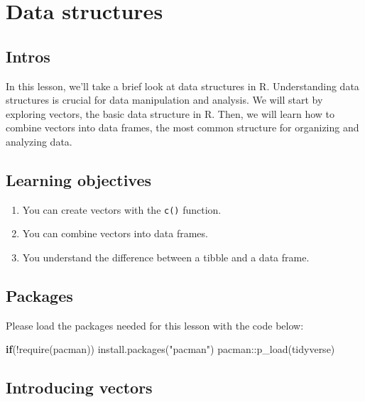 \documentclass[
  letterpaper,
  DIV=11,
  numbers=noendperiod]{scrreprt}
\newenvironment{Shaded}{\begin{snugshade}}{\end{snugshade}}
\newcommand{\ControlFlowTok}[1]{\textcolor[rgb]{0.00,0.23,0.31}{\textbf{#1}}}
\newcommand{\FunctionTok}[1]{\textcolor[rgb]{0.28,0.35,0.67}{#1}}
\newcommand{\NormalTok}[1]{\textcolor[rgb]{0.00,0.23,0.31}{#1}}
\newcommand{\SpecialCharTok}[1]{\textcolor[rgb]{0.37,0.37,0.37}{#1}}
\newcommand{\StringTok}[1]{\textcolor[rgb]{0.13,0.47,0.30}{#1}}
\begin{document}
\chapter{Data structures}\label{data-structures}

\section{Intros}\label{intros}

In this lesson, we'll take a brief look at data structures in R.
Understanding data structures is crucial for data manipulation and
analysis. We will start by exploring vectors, the basic data structure
in R. Then, we will learn how to combine vectors into data frames, the
most common structure for organizing and analyzing data.

\section{Learning objectives}\label{learning-objectives-5}

\begin{enumerate}
\def\labelenumi{\arabic{enumi}.}
\item
  You can create vectors with the \texttt{c()} function.
\item
  You can combine vectors into data frames.
\item
  You understand the difference between a tibble and a data frame.
\end{enumerate}

\section{Packages}\label{packages-3}

Please load the packages needed for this lesson with the code below:

\begin{Shaded}
\begin{Highlighting}[]
\ControlFlowTok{if}\NormalTok{(}\SpecialCharTok{!}\FunctionTok{require}\NormalTok{(pacman)) }\FunctionTok{install.packages}\NormalTok{(}\StringTok{"pacman"}\NormalTok{)}
\NormalTok{pacman}\SpecialCharTok{::}\FunctionTok{p\_load}\NormalTok{(tidyverse)}
\end{Highlighting}
\end{Shaded}

\section{Introducing vectors}\label{introducing-vectors}
\end{document}
